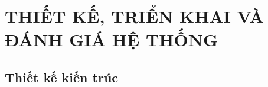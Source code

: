 %

\chapter{THIẾT KẾ, TRIỂN KHAI VÀ ĐÁNH GIÁ HỆ THỐNG}
\label{chap:thietke}
\label{chap:xaydung}
\label{chap:ketqua}





\section{Thiết kế kiến trúc}
\label{sec:tk-kientruc}

